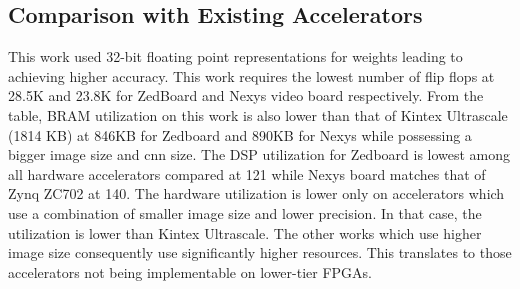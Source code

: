 \documentclass[a4paper,12pt,oneside]{book}
\begin{document}
\subsection*{Comparison with Existing Accelerators}
This work used 32-bit floating point representations for weights leading to achieving higher accuracy. This work requires the lowest number of flip flops at 28.5K and 23.8K for ZedBoard and Nexys video board respectively. From the table, BRAM utilization on this work is also lower than that of Kintex Ultrascale (1814 KB) at 846KB for Zedboard and 890KB for Nexys while possessing a bigger image size and cnn size. The DSP utilization for Zedboard is lowest among all hardware accelerators compared at 121 while Nexys board matches that of Zynq ZC702 at 140. The hardware utilization is lower only on accelerators which use a combination of smaller image size and lower precision. In that case, the utilization is lower than Kintex Ultrascale. The other works which use higher image size consequently use significantly higher resources. This translates to those accelerators not being implementable on lower-tier FPGAs.
\end{document}
